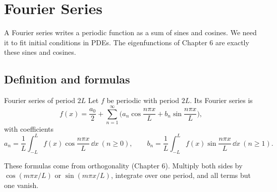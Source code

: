 \chapter{Fourier Series}

A Fourier series writes a periodic function as a sum of sines and cosines. We need it to fit initial conditions in PDEs. The eigenfunctions of Chapter 6 are exactly these sines and cosines.

\section{Definition and formulas}

\begin{defbox}{Fourier series of period $2L$}
Let $f$ be periodic with period $2L$. Its Fourier series is
\[ f(x) = \frac{a_0}{2} + \sum_{n=1}^{\infty}\Big(a_n\cos\frac{n\pi x}{L} + b_n\sin\frac{n\pi x}{L}\Big), \]
with coefficients
\[ a_n = \frac1L\int_{-L}^{L}f(x)\cos\frac{n\pi x}{L}\,\dd x \ (n\ge0), \qquad b_n = \frac1L\int_{-L}^{L}f(x)\sin\frac{n\pi x}{L}\,\dd x \ (n\ge1). \]
\end{defbox}

These formulas come from orthogonality (Chapter 6). Multiply both sides by $\cos(m\pi x/L)$ or $\sin(m\pi x/L)$, integrate over one period, and all terms but one vanish.

